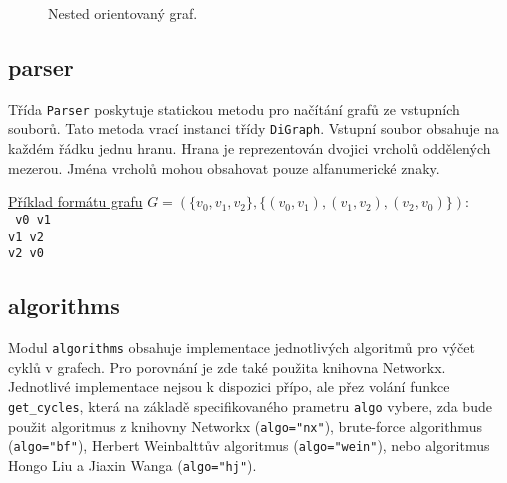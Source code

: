             \begin{figure}[!h]
                \centering
                \caption{Nested orientovaný graf.}
            \end{figure}

        \subsection{parser}
            Třída \texttt{Parser} poskytuje statickou metodu pro načítání grafů ze vstupních souborů. Tato metoda vrací instanci třídy \texttt{DiGraph}. Vstupní soubor obsahuje na každém řádku jednu hranu. Hrana je reprezentován dvojici vrcholů oddělených mezerou. Jména vrcholů mohou obsahovat pouze alfanumerické znaky.

            \vspace*{1em}
            \noindent \underline{Příklad formátu grafu} $G = (\{v_0, v_1, v_2\}, \{(v_0, v_1), (v_1, v_2), (v_2, v_0)\})$:
            \vspace*{0.5em}\\
            \noindent\texttt{
                v0 v1\\
                v1 v2\\
                v2 v0\\
            }

        \subsection{algorithms}
            Modul \texttt{algorithms} obsahuje implementace jednotlivých algoritmů pro výčet cyklů v grafech. Pro porovnání je zde také použita knihovna Networkx. Jednotlivé implementace nejsou k dispozici přípo, ale přez volání funkce \texttt{get\_cycles}, která na základě specifikovaného prametru \texttt{algo} vybere, zda bude použit algoritmus z knihovny Networkx \cite{Johnson_1975} (\texttt{algo="nx"}), brute-force algorithmus \cite[str. 287]{Book_algo} (\texttt{algo="bf"}), Herbert Weinbalttův algoritmus \cite{A_new_search_algorithm} (\texttt{algo="wein"}), nebo algoritmus Hongo Liu a Jiaxin Wanga \cite{A_new_way_to_enumerate_cycles_in_graph} (\texttt{algo="hj"}).

